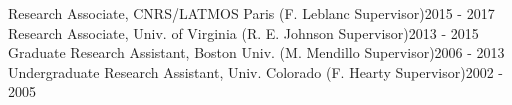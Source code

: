 \documentclass[12pt]{report}
\begin{document}
\noindent Research Associate, CNRS/LATMOS Paris (F. Leblanc Supervisor)\hfill 2015 - 2017\\
\noindent Research Associate, Univ. of Virginia (R. E. Johnson Supervisor)\hfill 2013 - 2015\\
\noindent Graduate Research Assistant, Boston Univ. (M. Mendillo Supervisor)\hfill 2006 - 2013\\
\noindent Undergraduate Research Assistant, Univ. Colorado (F. Hearty Supervisor)\hfill 2002 - 2005\\
\end{document}
